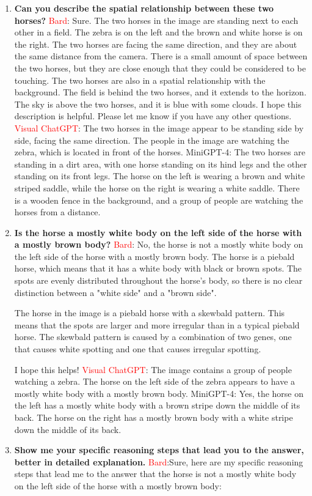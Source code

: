     \begin{enumerate}
        \item \textbf{Can you describe the spatial relationship between these two horses?}
        \subitem \textcolor{Red}{Bard}: 
        Sure. The two horses in the image are standing next to each other in a field. The zebra is on the left and the brown and white horse is on the right. The two horses are facing the same direction, and they are about the same distance from the camera. There is a small amount of space between the two horses, but they are close enough that they could be considered to be touching.
        The two horses are also in a spatial relationship with the background. The field is behind the two horses, and it extends to the horizon. The sky is above the two horses, and it is blue with some clouds.
        I hope this description is helpful. Please let me know if you have any other questions.
        \subitem \textcolor{red}{Visual ChatGPT}: The two horses in the image appear to be standing side by side, facing the same direction. The people in the image are watching the zebra, which is located in front of the horses.
        \subitem MiniGPT-4: The two horses are standing in a dirt area, with one horse standing on its hind legs and the other standing on its front legs. The horse on the left is wearing a brown and white striped saddle, while the horse on the right is wearing a white saddle. There is a wooden fence in the background, and a group of people are watching the horses from a distance.
        \item \textbf{Is the horse a mostly white body on the left side of the horse with a mostly brown body?}
        \subitem \textcolor{Red}{Bard}: 
        No, the horse is not a mostly white body on the left side of the horse with a mostly brown body. The horse is a piebald horse, which means that it has a white body with black or brown spots. The spots are evenly distributed throughout the horse's body, so there is no clear distinction between a "white side" and a "brown side".

        The horse in the image is a piebald horse with a skewbald pattern. This means that the spots are larger and more irregular than in a typical piebald horse. The skewbald pattern is caused by a combination of two genes, one that causes white spotting and one that causes irregular spotting.

        I hope this helps!
        \subitem \textcolor{red}{Visual ChatGPT}: The image contains a group of people watching a zebra. The horse on the left side of the zebra appears to have a mostly white body with a mostly brown body.
        \subitem MiniGPT-4: Yes, the horse on the left has a mostly white body with a brown stripe down the middle of its back. The horse on the right has a mostly brown body with a white stripe down the middle of its back.
        \item \textbf{Show me your specific reasoning steps that lead you to the answer, better in detailed explanation.}
        \subitem \textcolor{Red}{Bard}:Sure, here are my specific reasoning steps that lead me to the answer that the horse is not a mostly white body on the left side of the horse with a mostly brown body:


\end{enumerate}
